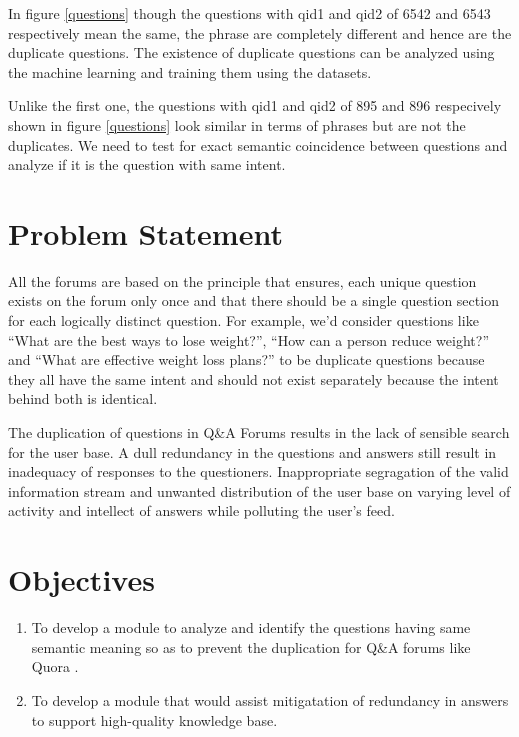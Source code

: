 In figure \ref{questions} though the questions with qid1 and qid2 of 6542 and 6543 respectively mean the same, the phrase are completely different and hence are the duplicate questions. The existence of duplicate questions can be analyzed using the machine learning and training them using the datasets.\par
Unlike the first one, the questions with qid1 and qid2 of 895 and 896 respecively shown in figure \ref{questions} look similar in terms of phrases but are not the duplicates. We need to test for exact semantic coincidence between questions and analyze if it is the question with same intent.

\section{Problem Statement}
All the forums are based on the principle that ensures, each unique question exists on the forum only once and that there should be a single question section for each logically distinct question.  For example, we'd consider questions like ``What are the best ways to lose weight?'', ``How can a person reduce weight?'' and ``What are effective weight loss plans?'' to be duplicate questions because they all have the same intent and should not exist separately because the intent behind both is identical.\par

The duplication of questions in Q\&A Forums results in the lack of sensible search for the user base. A dull redundancy in the questions and answers still result in inadequacy of responses to the questioners. Inappropriate segragation of the valid information stream and unwanted distribution of the user base on varying level of activity and intellect of answers while polluting the user's feed. 


\section{Objectives}
\begin{enumerate}
\item To develop a module to analyze and identify the questions having same semantic meaning so as to prevent the duplication for Q\&A forums like Quora .
\item To develop a module that would assist mitigatation of redundancy in answers to support high-quality knowledge base.
\end{enumerate}

